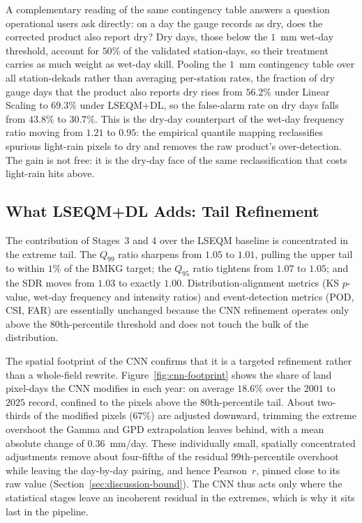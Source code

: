 A complementary reading of the same contingency table answers a
question operational users ask directly: on a day the gauge
records as dry, does the corrected product also report dry? Dry
days, those below the $1$~mm wet-day threshold, account for
$50\%$ of the validated station-days, so their treatment carries as
much weight as wet-day skill. Pooling the $1$~mm contingency table
over all station-dekads rather than averaging per-station rates,
the fraction of dry gauge days that the product
also reports dry rises from $56.2\%$ under Linear Scaling to
$69.3\%$ under LSEQM+DL, so the false-alarm rate on dry days
falls from $43.8\%$ to $30.7\%$. This is the dry-day counterpart
of the wet-day frequency ratio moving from $1.21$ to $0.95$: the
empirical quantile mapping reclassifies spurious light-rain pixels
to dry and removes the raw product's over-detection. The gain is
not free: it is the dry-day face of the same reclassification that
costs light-rain hits above.

\subsection*{What LSEQM+DL Adds: Tail Refinement}

The contribution of Stages~3 and 4 over the LSEQM baseline is
concentrated in the extreme tail. The $Q_{99}$ ratio sharpens
from $1.05$ to $1.01$, pulling the upper tail to within $1\%$
of the BMKG target; the $Q_{95}$ ratio tightens from $1.07$ to
$1.05$; and the SDR moves from $1.03$ to exactly $1.00$.
Distribution-alignment metrics (KS $p$-value, wet-day frequency
and intensity ratios) and event-detection metrics (POD, CSI,
FAR) are essentially unchanged because the CNN refinement
operates only above the $80$th-percentile threshold and does not
touch the bulk of the distribution.

The spatial footprint of the CNN confirms that it is a targeted
refinement rather than a whole-field rewrite.
Figure~\ref{fig:cnn-footprint} shows the share of land pixel-days
the CNN modifies in each year: on average $18.6\%$ over the
$2001$ to $2025$ record, confined to the pixels above the
$80$th-percentile tail. About two-thirds of the modified pixels
($67\%$) are adjusted downward, trimming the extreme overshoot the
Gamma and GPD extrapolation leaves behind, with a mean absolute
change of $0.36$~mm/day. These individually small, spatially
concentrated adjustments remove about four-fifths of the residual
$99$th-percentile overshoot while leaving the day-by-day pairing,
and hence Pearson~$r$, pinned close to its raw value
(Section~\ref{sec:discussion-bound}). The CNN thus acts only where
the statistical stages leave an incoherent residual in the
extremes, which is why it sits last in the pipeline.

